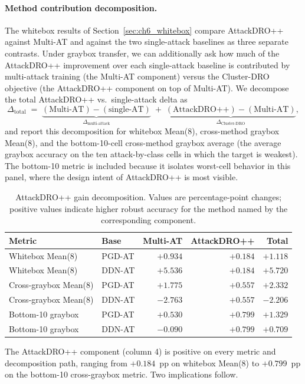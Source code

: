 \paragraph{Method contribution decomposition.}

The whitebox results of Section~\ref{sec:ch6_whitebox} compare AttackDRO++
against Multi-AT and against the two single-attack baselines as
three separate contrasts. Under graybox transfer, we can additionally
ask how much of the AttackDRO++ improvement over each single-attack
baseline is contributed by multi-attack training (the Multi-AT
component) versus the Cluster-DRO objective (the AttackDRO++ component
on top of Multi-AT). We decompose the total
AttackDRO++ vs.\ single-attack delta as
\[
\Delta_{\text{total}}
\;=\;
\underbrace{(\text{Multi-AT}) - (\text{single-AT})}_{\Delta_{\text{multi-attack}}}
\;+\;
\underbrace{(\text{AttackDRO++}) - (\text{Multi-AT})}_{\Delta_{\text{Cluster-DRO}}},
\]
and report this decomposition for whitebox Mean(8), cross-method graybox
Mean(8), and the bottom-10-cell cross-method graybox average (the average
graybox accuracy on the ten attack-by-class cells in which the target is
weakest). The bottom-10 metric is included because it isolates worst-cell
behavior in this panel, where the design intent of AttackDRO++ is most visible.

\begin{table}[H]
\centering
\caption[AttackDRO++ gain decomposition]{AttackDRO++ gain decomposition. Values are percentage-point changes; positive values indicate higher robust accuracy for the method named by the corresponding component.}
\label{tab:ch6_graybox_decomposition}
\small
\setlength{\tabcolsep}{6pt}
\renewcommand{\arraystretch}{1.10}
\begin{tabular}{llrrr}
\toprule
Metric & Base & Multi-AT & AttackDRO++ & Total \\
\midrule
Whitebox Mean(8)        & PGD-AT & $+0.934$ & $+0.184$ & $+1.118$ \\
Whitebox Mean(8)        & DDN-AT & $+5.536$ & $+0.184$ & $+5.720$ \\
\midrule
Cross-graybox Mean(8)   & PGD-AT & $+1.775$ & $+0.557$ & $+2.332$ \\
Cross-graybox Mean(8)   & DDN-AT & $-2.763$ & $+0.557$ & $-2.206$ \\
\midrule
Bottom-10 graybox       & PGD-AT & $+0.530$ & $+0.799$ & $+1.329$ \\
Bottom-10 graybox       & DDN-AT & $-0.090$ & $+0.799$ & $+0.709$ \\
\bottomrule
\end{tabular}
\end{table}
The AttackDRO++ component (column 4) is positive on every metric and
decomposition path, ranging from $+0.184$~pp on whitebox Mean(8) to
$+0.799$~pp on the bottom-10 cross-graybox metric. Two implications
follow. 

